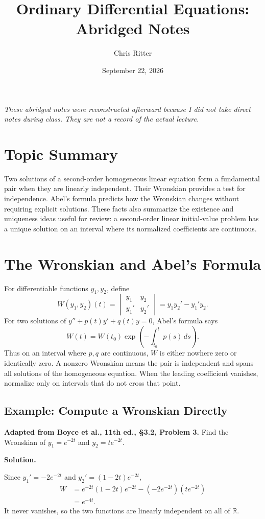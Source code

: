 \documentclass[11pt]{article}
\title{Ordinary Differential Equations: Abridged Notes}
\author{Chris Ritter}
\date{September 22, 2026}
\newenvironment{solution}
    {\par\noindent\textbf{Solution.}\par}
    {\par}
\begin{document}
\maketitle
\begin{center}
\small\emph{These abridged notes were reconstructed afterward because I did not take
direct notes during class. They are not a record of the actual lecture.}
\end{center}
\tableofcontents
\newpage

\section{Topic Summary}
Two solutions of a second-order homogeneous linear equation form a
fundamental pair when they are linearly independent. Their Wronskian
provides a test for independence. Abel's formula predicts how the
Wronskian changes without requiring explicit solutions. These facts
also summarize the existence and uniqueness ideas useful for review:
a second-order linear initial-value problem has a unique solution on
an interval where its normalized coefficients are continuous.

\section{The Wronskian and Abel's Formula}
For differentiable functions \(y_1,y_2\), define
\[
W(y_1,y_2)(t)=
\begin{vmatrix}y_1&y_2\\y_1'&y_2'\end{vmatrix}
=y_1y_2'-y_1'y_2.
\]
For two solutions of \(y''+p(t)y'+q(t)y=0\), Abel's formula says
\[
\boxed{W(t)=W(t_0)\exp\left(-\int_{t_0}^{t}p(s)\,ds\right).}
\]
Thus on an interval where \(p,q\) are continuous, \(W\) is either
nowhere zero or identically zero. A nonzero Wronskian means the pair
is independent and spans all solutions of the homogeneous equation.
When the leading coefficient vanishes, normalize only on intervals
that do not cross that point.

\subsection{Example: Compute a Wronskian Directly}
\textbf{Adapted from Boyce et al., 11th ed., \S3.2, Problem 3.}
Find the Wronskian of \(y_1=e^{-2t}\) and \(y_2=te^{-2t}\).
\begin{solution}
Since \(y_1'=-2e^{-2t}\) and
\(y_2'=(1-2t)e^{-2t}\),
\[
\begin{aligned}
W&=e^{-2t}(1-2t)e^{-2t}
-(-2e^{-2t})(te^{-2t})\\
&=\boxed{e^{-4t}}.
\end{aligned}
\]
It never vanishes, so the two functions are linearly independent on
all of \(\mathbb R\).
\end{solution}
\end{document}
